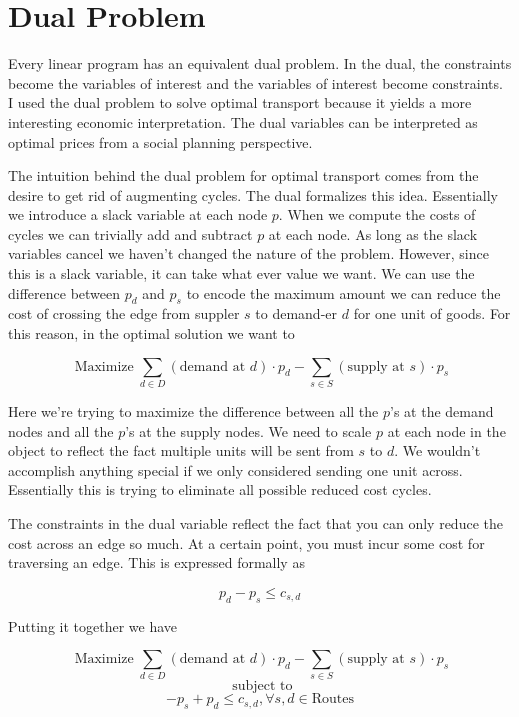 \documentclass{report}
\begin{document}
\section{Dual Problem}

Every linear program has an equivalent dual problem. In the dual, the constraints become the variables of interest and the variables of interest become constraints. I used the dual problem to solve optimal transport because it yields a more interesting economic interpretation. The dual variables can be interpreted as optimal prices from a social planning perspective.

The intuition behind the dual problem for optimal transport comes from the desire to get rid of augmenting cycles. The dual formalizes this idea. Essentially we introduce a slack variable at each node $p$. When we compute the costs of cycles we can trivially add and subtract $p$ at each node. As long as the slack variables cancel we haven't changed the nature of the problem. However, since this is a slack variable, it can take what ever value we want. We can use the difference between $p_d$ and $p_s$ to encode the maximum amount we can reduce the cost of crossing the edge from suppler $s$ to demand-er $d$ for one unit of goods. For this reason, in the optimal solution we want to

$$\operatorname{Maximize} \sum_{d \in D}  (\text{demand at } d) \cdot p_{d} -   \sum_{s \in S}  (\text{supply at } s) \cdot p_{s} $$

Here we're trying to maximize the difference between all the $p$'s at the demand nodes and all the $p$'s at the supply nodes. We need to scale $p$ at each node in the object to reflect the fact multiple units will be sent from $s$ to $d$. We wouldn't accomplish anything special if we only considered sending one unit across. Essentially this is trying to eliminate all possible reduced cost cycles.

The constraints in the dual variable reflect the fact that you can only reduce the cost across an edge so much. At a certain point, you must incur some cost for traversing an edge. This is expressed formally as

$$ p_d -p_s  \leq c_{s,d}$$

Putting it together we have

$$\operatorname{Maximize} \sum_{d \in D}  (\text{demand at } d) \cdot p_{d} -   \sum_{s \in S}  (\text{supply at } s) \cdot p_{s} $$
$$ \text{ subject to}$$
$$ -p_s + p_d \leq c_{s,d}, \forall s,d\in \textrm{Routes}$$
\end{document}
